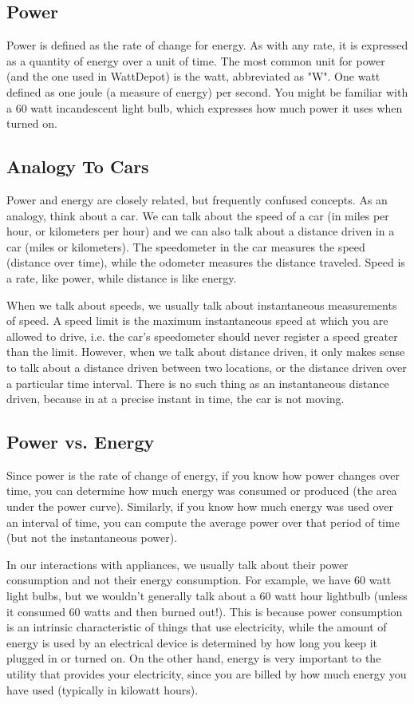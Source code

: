 \subsection{Power}

Power is defined as the rate of change for energy. As with any rate, it is expressed as a quantity of energy over a unit of time. The most common unit for power (and the one used in WattDepot) is the watt, abbreviated as "W". One watt defined as one joule (a measure of energy) per second. You might be familiar with a 60 watt incandescent light bulb, which expresses how much power it uses when turned on.

\subsection{Analogy To Cars}

Power and energy are closely related, but frequently confused concepts. As an analogy, think about a car. We can talk about the speed of a car (in miles per hour, or kilometers per hour) and we can also talk about a distance driven in a car (miles or kilometers). The speedometer in the car measures the speed (distance over time), while the odometer measures the distance traveled. Speed is a rate, like power, while distance is like energy.

When we talk about speeds, we usually talk about instantaneous measurements of speed. A speed limit is the maximum instantaneous speed at which you are allowed to drive, i.e. the car's speedometer should never register a speed greater than the limit. However, when we talk about distance driven, it only makes sense to talk about a distance driven between two locations, or the distance driven over a particular time interval. There is no such thing as an instantaneous distance driven, because in at a precise instant in time, the car is not moving.

\subsection{Power vs. Energy}

Since power is the rate of change of energy, if you know how power changes over time, you can determine how much energy was consumed or produced (the area under the power curve). Similarly, if you know how much energy was used over an interval of time, you can compute the average power over that period of time (but not the instantaneous power).

In our interactions with appliances, we usually talk about their power consumption and not their energy consumption. For example, we have 60 watt light bulbs, but we wouldn't generally talk about a 60 watt hour lightbulb (unless it consumed 60 watts and then burned out!). This is because power consumption is an intrinsic characteristic of things that use electricity, while the amount of energy is used by an electrical device is determined by how long you keep it plugged in or turned on. On the other hand, energy is very important to the utility that provides your electricity, since you are billed by how much energy you have used (typically in kilowatt hours).

